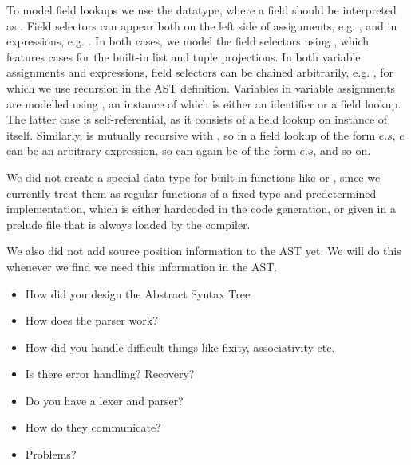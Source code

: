 To model field lookups we use the  datatype, where a field
 should be interpreted as .
Field selectors can appear both on the left side of assignments, e.g.
, and in expressions, e.g. . In both cases, we
model the field selectors using , which features cases for the
built-in list and tuple projections.
In both variable assignments and expressions, field selectors can be chained
arbitrarily, e.g. , for which we use recursion in the AST
definition.
Variables in variable assignments are modelled using , an
instance of which is either an identifier or a field lookup. The latter case is
self-referential, as it consists of a field lookup on instance of
 itself.
Similarly,  is mutually recursive with , so in
a field lookup of the form $e.s$, $e$ can be an arbitrary expression, so can
again be of the form $e.s$, and so on.

We did not create a special data type for built-in functions like
 or , since we currently treat them as regular functions
of a fixed type and predetermined implementation, which is either hardcoded in
the code generation, or given in a prelude file that is always loaded by the
compiler.




We also did not add source position information to the AST yet.
We will do this whenever we find we need this information in the AST.

\begin{todoenv}
  \begin{itemize}
    \item How did you design the Abstract Syntax Tree
    \item How does the parser work?
    \item How did you handle difficult things like fixity, associativity etc.
    \item Is there error handling? Recovery?
    \item Do you have a lexer and parser?
    \item How do they communicate?
    \item Problems?
  \end{itemize}
\end{todoenv}
